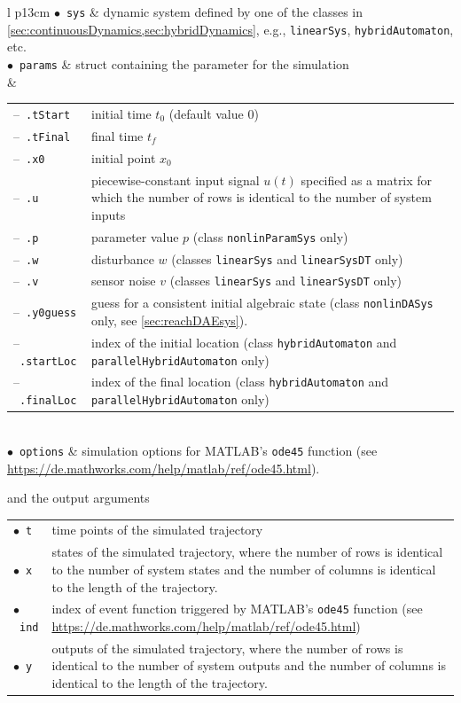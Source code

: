 \begin{center}
\renewcommand{\arraystretch}{1.3}
\begin{tabular}[t]{l p{13cm} }
	$\bullet$~\texttt{sys} &  dynamic system defined by one of the classes in \cref{sec:continuousDynamics,sec:hybridDynamics}, e.g., \texttt{linearSys}, \texttt{hybridAutomaton}, etc. \\
	$\bullet$~\texttt{params} & struct containing the parameter for the simulation \\
	 & \begin{tabular}[t]{l p{10cm}}	
	 	--~\texttt{.tStart} & initial time $t_0$ (default value 0) \\
	 	--~\texttt{.tFinal} & final time $t_f$ \\ 	
	 	--~\texttt{.x0} & initial point $x_0$ \\
	 	--~\texttt{.u} & piecewise-constant input signal $u(t)$ specified as a matrix for which the number of rows is identical to the number of system inputs \\
	 	--~\texttt{.p} & parameter value $p$ (class \texttt{nonlinParamSys} only) \\
	 	--~\texttt{.w} & disturbance $w$ (classes \texttt{linearSys} and \texttt{linearSysDT} only) \\
	 	--~\texttt{.v} & sensor noise $v$ (classes \texttt{linearSys} and \texttt{linearSysDT} only) \\
	 	--~\texttt{.y0guess} & guess for a consistent initial algebraic state (class \texttt{nonlinDASys} only, see \cref{sec:reachDAEsys}). \\
	 	--~\texttt{.startLoc} & index of the initial location (class \texttt{hybridAutomaton} and \texttt{parallelHybridAutomaton} only) \\
	 	--~\texttt{.finalLoc} & index of the final location (class \texttt{hybridAutomaton} and \texttt{parallelHybridAutomaton} only)
	 	\end{tabular}	\\
	$\bullet$~\texttt{options} & simulation options for MATLAB's \texttt{ode45} function (see \url{https://de.mathworks.com/help/matlab/ref/ode45.html}).
\end{tabular}
\end{center}
and the output arguments
\begin{center}
\renewcommand{\arraystretch}{1.3}
\begin{tabular}[t]{l p{13cm} }
	$\bullet$~\texttt{t} & time points of the simulated trajectory \\
	$\bullet$~\texttt{x} & states of the simulated trajectory, where the number of rows is identical to the number of
	system states and the number of columns is identical to the length of the trajectory. \\
	$\bullet$~\texttt{ind} & index of event function triggered by MATLAB's \texttt{ode45} function (see \url{https://de.mathworks.com/help/matlab/ref/ode45.html}) \\
	$\bullet$~\texttt{y} & outputs of the simulated trajectory, where the number of rows is identical to the number of
	system outputs and the number of columns is identical to the length of the trajectory.
\end{tabular}
\end{center}

